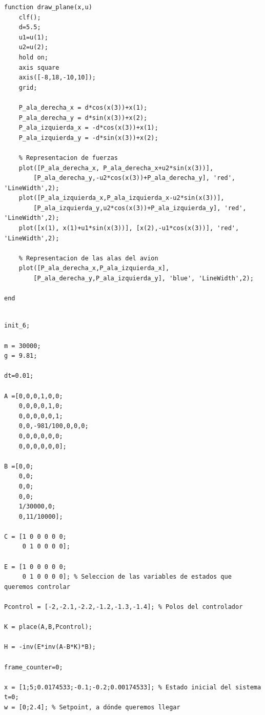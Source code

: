 \documentclass{article}
\begin{document}
\begin{itemize}
\begin{tcolorbox}
\begin{scriptsize}
\begin{verbatim}
function draw_plane(x,u)
    clf();
    d=5.5;
    u1=u(1);
    u2=u(2);
    hold on;
    axis square
    axis([-8,18,-10,10]);
    grid;
    
    P_ala_derecha_x = d*cos(x(3))+x(1);
    P_ala_derecha_y = d*sin(x(3))+x(2);
    P_ala_izquierda_x = -d*cos(x(3))+x(1);
    P_ala_izquierda_y = -d*sin(x(3))+x(2);
    
    % Representacion de fuerzas
    plot([P_ala_derecha_x, P_ala_derecha_x+u2*sin(x(3))],
    	[P_ala_derecha_y,-u2*cos(x(3))+P_ala_derecha_y], 'red', 'LineWidth',2);
    plot([P_ala_izquierda_x,P_ala_izquierda_x-u2*sin(x(3))],
    	[P_ala_izquierda_y,u2*cos(x(3))+P_ala_izquierda_y], 'red', 'LineWidth',2);
    plot([x(1), x(1)+u1*sin(x(3))], [x(2),-u1*cos(x(3))], 'red', 'LineWidth',2);
    
    % Representacion de las alas del avion
    plot([P_ala_derecha_x,P_ala_izquierda_x],
    	[P_ala_derecha_y,P_ala_izquierda_y], 'blue', 'LineWidth',2);
    
end

\end{verbatim}
\end{scriptsize}
\end{tcolorbox}


\begin{tcolorbox}
[
title={File \texttt{answer\_6\_main.m}}      
]
\begin{scriptsize}
\begin{verbatim}

init_6;

m = 30000;
g = 9.81;

dt=0.01;

A =[0,0,0,1,0,0;
    0,0,0,0,1,0;
    0,0,0,0,0,1;
    0,0,-981/100,0,0,0;
    0,0,0,0,0,0;
    0,0,0,0,0,0];

B =[0,0;
    0,0;
    0,0;
    0,0;
    1/30000,0;
    0,11/10000];

C = [1 0 0 0 0 0;
     0 1 0 0 0 0];

E = [1 0 0 0 0 0;
     0 1 0 0 0 0]; % Seleccion de las variables de estados que queremos controlar

Pcontrol = [-2,-2.1,-2.2,-1.2,-1.3,-1.4]; % Polos del controlador

K = place(A,B,Pcontrol);

H = -inv(E*inv(A-B*K)*B);

frame_counter=0;

x = [1;5;0.0174533;-0.1;-0.2;0.00174533]; % Estado inicial del sistema
t=0;
w = [0;2.4]; % Setpoint, a dónde queremos llegar


\end{verbatim}
\end{scriptsize}
\end{tcolorbox}
\end{itemize}
\end{document}
